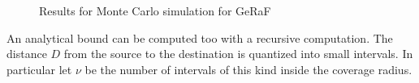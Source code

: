 \documentclass[10pt]{article}
\begin{document}
\begin{figure}[h!]
  \centering
  \caption{Results for Monte Carlo simulation for GeRaF}
  \label{fig:geraf1}
\end{figure}

An analytical bound can be computed too with a recursive computation. The distance $D$ from the source to the destination is quantized into small intervals. In particular let $\nu$ be the number of intervals of this kind inside the coverage radius. 
\end{document}
